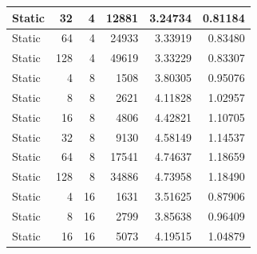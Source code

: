\documentclass[journal,transmag]{IEEEtran}
\begin{document}
\begin{table}[h]
\begin{tabular}{|l|r|r|r|r|r|}
		Static        & 32                           & 4                            & 12881                             & 3.24734                       & 0.81184                         \\ \hline
		Static        & 64                           & 4                            & 24933                             & 3.33919                       & 0.83480                         \\ \hline
		Static        & 128                          & 4                            & 49619                             & 3.33229                       & 0.83307                         \\ \hline
		Static        & 4                            & 8                            & 1508                              & 3.80305                       & 0.95076                         \\ \hline
		Static        & 8                            & 8                            & 2621                              & 4.11828                       & 1.02957                         \\ \hline
		Static        & 16                           & 8                            & 4806                              & 4.42821                       & 1.10705                         \\ \hline
		Static        & 32                           & 8                            & 9130                              & 4.58149                       & 1.14537                         \\ \hline
		Static        & 64                           & 8                            & 17541                             & 4.74637                       & 1.18659                         \\ \hline
		Static        & 128                          & 8                            & 34886                             & 4.73958                       & 1.18490                         \\ \hline
		Static        & 4                            & 16                           & 1631                              & 3.51625                       & 0.87906                         \\ \hline
		Static        & 8                            & 16                           & 2799                              & 3.85638                       & 0.96409                         \\ \hline
		Static        & 16                           & 16                           & 5073                              & 4.19515                       & 1.04879                         \\ \hline

\end{tabular}
\end{table}
\end{document}
